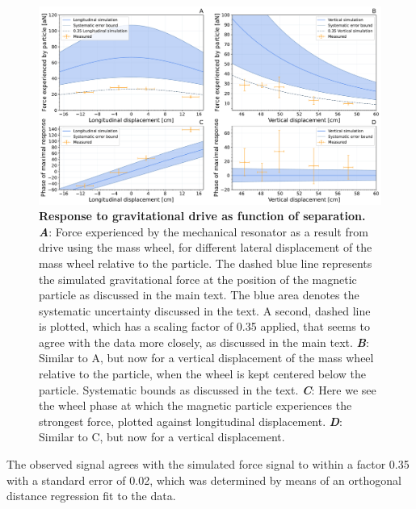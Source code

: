\documentclass[pdflatex,sn-mathphys]{sn-jnl}
\begin{document}
    \begin{figure}[ht]%
        \centering
        \includegraphics[width=\textwidth]{Results/paper_full_combined.pdf}%
        \caption{\textbf{Response to gravitational drive as function of separation.}\\
        \textbf{\emph{A}}: Force experienced by the mechanical resonator as a result from drive using the mass wheel, for different lateral displacement of the mass wheel relative to the particle. The dashed blue line represents the simulated gravitational force at the position of the magnetic particle as discussed in the main text. The blue area denotes the systematic uncertainty discussed in the text. A second, dashed line is plotted, which has a scaling factor of 0.35 applied, that seems to agree with the data more closely, as discussed in the main text. \textbf{\emph{B}}: Similar to A, but now for a vertical displacement of the mass wheel relative to the particle, when the wheel is kept centered below the particle. Systematic bounds as discussed in the text.   \textbf{\emph{C}}: Here we see the wheel phase at which the magnetic particle experiences the strongest force, plotted against longitudinal displacement. \textbf{\emph{D}}: Similar to C, but now for a vertical displacement.\\}\label{fig3:force}
    \end{figure}
    
    The observed signal agrees with the simulated force signal to within a factor 0.35 with a standard error of 0.02, which was determined by means of an orthogonal distance regression fit to the data.
\end{document}
